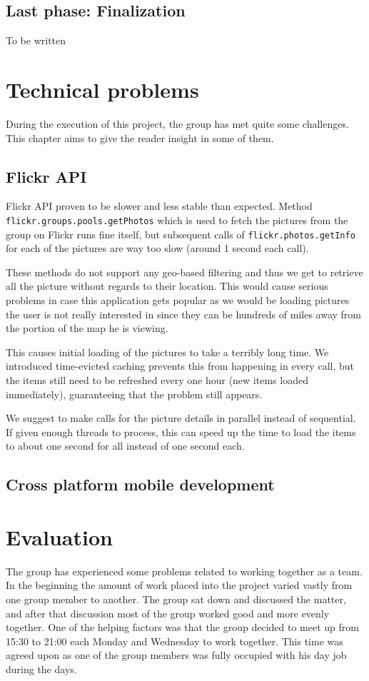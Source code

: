 \documentclass[11pt]{book}
\begin{document}
\section{Last phase: Finalization}
To be written

\chapter{Technical problems}\label{chap:technical_problems}
During the execution of this project, the group has met quite some challenges. This chapter aims to give the reader insight in some of them.

\section{Flickr API}
Flickr API proven to be slower and less stable than expected. Method \texttt{flickr.groups.pools.getPhotos} which is used to fetch the pictures from the group on Flickr runs fine itself, but subsequent calls of \texttt{flickr.photos.getInfo} for each of the pictures are way too slow (around 1 second each call).

These methods do not support any geo-based filtering and thus we get to retrieve all the picture without regards to their location. This would cause serious problems in case this application gets popular as we would be loading pictures the user is not really interested in since they can be hundreds of miles away from the portion of the map he is viewing.

This causes initial loading of the pictures to take a terribly long time. We introduced time-evicted caching prevents this from happening in every call, but the items still need to be refreshed every one hour (new items loaded immediately), guaranteeing that the problem still appears.

We suggest to make calls for the picture details in parallel instead of sequential. If given enough threads to process, this can speed up the time to load the items to about one second for all instead of one second each.


\section{Cross platform mobile development}

\chapter{Evaluation}
The group has experienced some problems related to working together as a team. In the beginning the amount of work placed into the project varied vastly from one group member to another. The group sat down and discussed the matter, and after that discussion most of the group worked good and more evenly together. One of the helping factors was that the group decided to meet up from 15:30 to 21:00 each Monday and Wednesday to work together. This time was agreed upon as one of the group members was fully occupied with his day job during the days.
\end{document}
